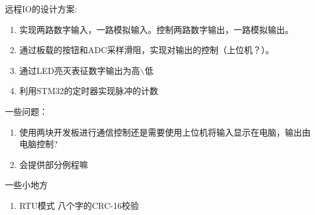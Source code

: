 \documentclass{article}
\begin{document}
远程IO的设计方案:
\begin{enumerate}
	\item 实现两路数字输入，一路模拟输入。控制两路数字输出，一路模拟输出。
	\item 通过板载的按钮和ADC采样滑阻，实现对输出的控制（上位机？）。
	\item 通过LED亮灭表征数字输出为高$\backslash$低
	\item 利用STM32的定时器实现脉冲的计数
\end{enumerate}
一些问题：
\begin{enumerate}
	\item 使用两块开发板进行通信控制还是需要使用上位机将输入显示在电脑，输出由电脑控制?
	\item 会提供部分例程嘛 
\end{enumerate}

一些小地方
\begin{enumerate}
	\item RTU模式 八个字的CRC-16校验
\end{enumerate}
\end{document}
